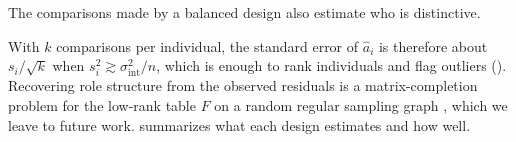 \documentclass[twoside,11pt]{article}
\newcommand{\E}{\mathbb{E}}
\DeclareMathOperator{\Var}{Var}
\newcommand{\sigmaint}{\sigma^2_{\mathrm{int}}}
\begin{document}
The comparisons made by a balanced design also estimate who is distinctive.


With $k$ comparisons per individual, the standard error of $\widehat a_i$
is therefore about $s_i/\sqrt{k}$ when $s_i^2\gtrsim\sigmaint/n$, which is enough to rank individuals and
flag outliers (). Recovering role structure from the
observed residuals is a matrix-completion problem for the low-rank table
$F$ on a random regular sampling graph \citep{candes2009exact}, which we
leave to future work.  summarizes what each design
estimates and how well.
\end{document}
